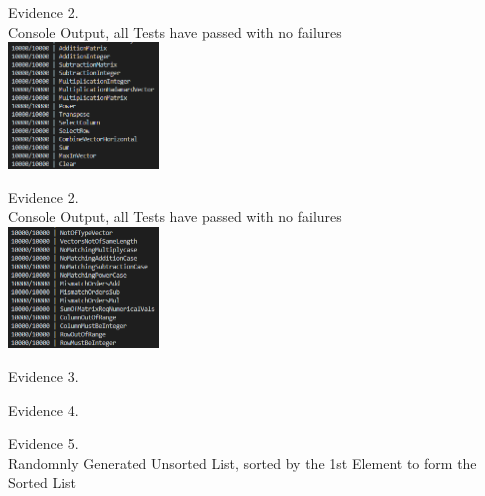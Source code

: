 \begin{flushleft}
\begin{center}
        {\large Evidence 2.\rn } \\ 
        \vspace{0.3cm}
        Console Output, all Tests have passed with no failures \\
        \includegraphics[width=4cm]{Images/Testing/T2.18.1.PNG} \\
        \vspace{1cm}

        {\large Evidence 2.\rn } \\ 
        \vspace{0.3cm}
        Console Output, all Tests have passed with no failures \\
        \includegraphics[width=4cm]{Images/Testing/T2.19.1.PNG} \\
        \vspace{1cm}
    \end{center}

    \setcounter{magicrownumbers}{0}
    \begin{center}
        {\large Evidence 3.\rn } \\ 
        \vspace{0.3cm}
    \end{center}

    \setcounter{magicrownumbers}{0}
    \begin{center}
        {\large Evidence 4.\rn } \\ 
        \vspace{0.3cm}

    \end{center}

    \setcounter{magicrownumbers}{0}
    \begin{center}
        {\large Evidence 5.\rn } \\ 
        \vspace{0.3cm}
        Randomnly Generated Unsorted List, sorted by the 1st Element to form the Sorted List \\


\end{center}
\end{flushleft}
